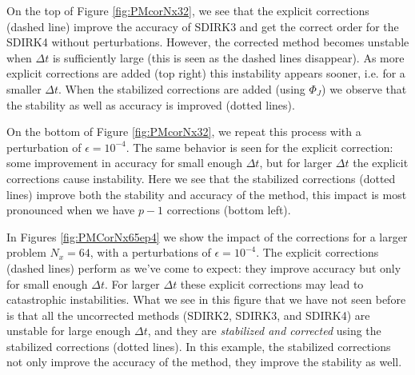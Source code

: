 \documentclass{siamart251104}
\newcommand{\dt}{\Delta t}
\begin{document}
On the top of Figure \ref{fig:PMcorNx32}, 
we see that the  explicit corrections (dashed line) 
improve the accuracy of SDIRK3 and get the correct order for 
the SDIRK4 without  perturbations.
However, the corrected method becomes unstable when $\dt$ is sufficiently large 
(this is seen as the dashed lines disappear).
As more explicit corrections are added (top right) this instability appears sooner,
i.e. for a smaller $\dt$.
When the  stabilized corrections are added (using  $\Phi_J$)
we observe that the stability as well as accuracy is improved (dotted lines). 

On the bottom of Figure \ref{fig:PMcorNx32}, we repeat this process with a
perturbation of $\epsilon = 10^{-4}$. The same behavior is seen for the explicit
correction: some improvement in accuracy for small enough $\dt$, but for larger $\dt$
the explicit corrections cause instability.
Here we see that the stabilized corrections (dotted lines) improve both the stability
and accuracy of the method, this impact is most pronounced when we have $p-1$
corrections (bottom left).

In Figures \ref{fig:PMCorNx65ep4} we show the impact of the corrections
for a larger problem $N_x=64$, with a perturbations of $\epsilon = 10^{-4}$.
The explicit corrections (dashed lines) perform as we've come to expect: 
they improve accuracy but only for small enough $\dt$. For larger $\dt$
these explicit corrections may lead to catastrophic instabilities. What we see in this figure
that we have not seen before is that all the uncorrected methods (SDIRK2,
SDIRK3, and SDIRK4) are unstable for large enough $\dt$, and they 
are {\em stabilized and corrected} using the stabilized corrections
(dotted lines). In this example, the stabilized corrections not only 
improve the accuracy of the method, they improve the stability as well.
\end{document}

